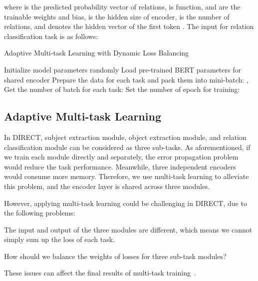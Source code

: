 \documentclass[11pt,a4paper]{article}
\begin{document}
where  is the predicted probability vector of relations,  is  function,  and  are the trainable weights and bias,  is the hidden size of encoder,  is the number of relations, and  denotes the hidden vector of the first token . The input for relation classification task is as follows:


\begin{algorithm}[ht]
\caption{Adaptive Multi-task Learning with Dynamic Loss Balancing}\label{algo:mtl}
\LinesNumbered Initialize model parameters  randomly\;
Load pre-trained BERT parameters for shared encoder\;
Prepare the data for each task  and pack them into mini-batch: ,  \;
Get the number of batch for each task: \; 
Set the number of epoch for training: \;
\end{algorithm}

\subsection{Adaptive Multi-task Learning}
In DIRECT, subject extraction module, object extraction module, and relation classification module can be considered as three sub-tasks. As aforementioned, if we train each module directly and separately, the error propagation problem would reduce the task performance. Meanwhile, three independent encoders would consume more memory. Therefore, we use multi-task learning to alleviate this problem, and the encoder layer is shared across three modules.

However, applying multi-task learning could be challenging in DIRECT, due to the following problems:

 The input and output of the three modules are different, which means we cannot simply sum up the loss of each task.

 How should we balance the weights of losses for three sub-task modules?

These issues can affect the final results of multi-task training~\cite{shen2019multi,sener2018multi}.
\end{document}
